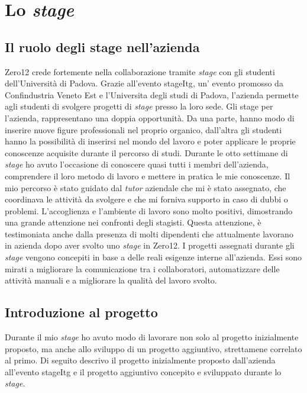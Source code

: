 
\chapter{Lo \textit{stage}}
\label{cap:lo-stage}



\section{Il ruolo degli stage nell'azienda}
Zero12 crede fortemente nella collaborazione tramite \textit{stage} con gli studenti dell'Università di Padova. Grazie all'evento \gls{stageItg}, un' evento promosso da Confindustria Veneto Est e l'Universita degli studi di Padova, l'azienda permette agli studenti di svolgere progetti di \textit{stage} presso la loro sede.
Gli stage per l'azienda, rappresentano una doppia opportunità. Da una parte, hanno modo di inserire nuove figure professionali nel proprio organico, dall’altra gli studenti hanno la possibilità di inserirsi nel mondo del lavoro e poter applicare le proprie conoscenze acquisite durante il percorso di studi.
Durante le otto settimane di \textit{stage} ho avuto l’occasione di conoscere quasi tutti i membri dell’azienda, comprendere il loro metodo di lavoro e mettere in pratica le mie conoscenze. Il mio percorso è stato guidato dal \textit{tutor} aziendale che mi è stato assegnato, che coordinava le attività da svolgere e che mi forniva supporto in caso di dubbi o problemi. 
L'accoglienza e l'ambiente di lavoro sono molto positivi, dimostrando una grande attenzione nei confronti degli stagisti. 
Questa attenzione, è testimoniata anche dalla presenza di molti dipendenti che attualmente lavorano in azienda dopo aver svolto uno \textit{stage} in Zero12.
I progetti assegnati durante gli \textit{stage} vengono concepiti in base a delle reali esigenze interne all’azienda. Essi sono mirati a migliorare la comunicazione tra i collaboratori, automatizzare delle attività manuali e a migliorare la qualità del lavoro svolto.

\section{Introduzione al progetto}
Durante il mio \textit{stage} ho avuto modo di lavorare non solo al progetto inizialmente proposto, ma anche allo sviluppo di un progetto aggiuntivo, strettamene correlato al primo.
Di seguito descrivo il progetto inizialmente proposto dall'azienda all'evento \gls{stageItg} e il progetto aggiuntivo concepito e sviluppato durante lo \textit{stage}.

